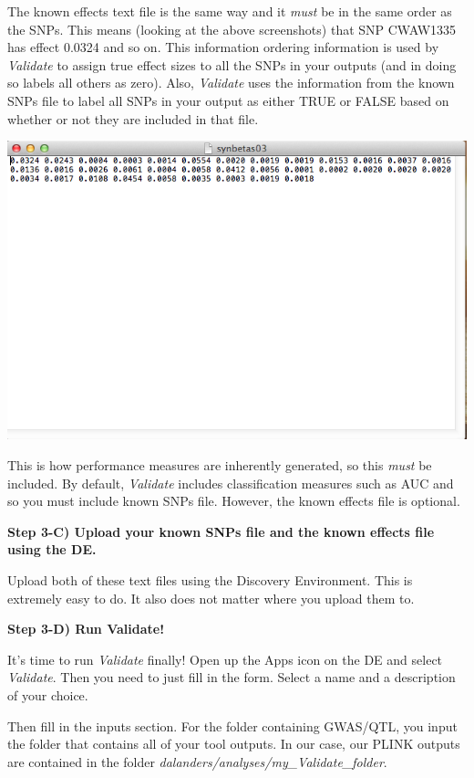 \documentclass[twoside,a4paper]{refart}
\begin{document}
The known effects text file is the same way and it \textit{must} be in the same order as the SNPs. This means (looking at the above screenshots) that SNP CWAW1335 has effect 0.0324 and so on. This information ordering information is used by \textit{Validate} to assign true effect sizes to all the SNPs in your outputs (and in doing so labels all others as zero). Also, \textit{Validate} uses the information from the known SNPs file to label all SNPs in your output as either TRUE or FALSE based on whether or not they are included in that file. 

\includegraphics[width=\textwidth]{doc_step3_3}

This is how performance measures are inherently generated, so this \textit{must} be included. By default, \textit{Validate} includes classification measures such as AUC and so you must include known SNPs file. However, the known effects file is optional. 

\textbf{Step 3-C) Upload your known SNPs file and the known effects file using the DE.}

Upload both of these text files using the Discovery Environment. This is extremely easy to do. It also does not matter where you upload them to.

\textbf{Step 3-D) Run Validate!}

It's time to run \textit{Validate} finally! Open up the Apps icon on the DE and select \textit{Validate}. Then you need to just fill in the form. Select a name and a description of your choice.

Then fill in the inputs section. For the folder containing GWAS/QTL, you input the folder that contains all of your tool outputs. In our case, our PLINK outputs are contained in the folder \textit{dalanders/analyses/my\_Validate\_folder}. 
\end{document}
